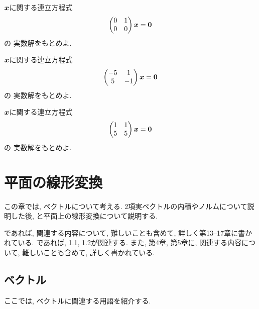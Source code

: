 \begin{quiz}
  \label{quiz:3:8}
  $\boldsymbol{x}$に関する連立方程式
  \begin{align*}
    \begin{pmatrix}0&1\\0&0\end{pmatrix}
      \boldsymbol{x}
      =\boldsymbol{0}
  \end{align*}
  の
  実数解をもとめよ.
\end{quiz}

\begin{quiz}
  \label{quiz:3:9}
  $\boldsymbol{x}$に関する連立方程式
  \begin{align*}
    \begin{pmatrix}-5&1\\5&-1\end{pmatrix}
      \boldsymbol{x}
      =\boldsymbol{0}
  \end{align*}
  の
  実数解をもとめよ.
\end{quiz}

\begin{quiz}
  \label{quiz:3:10}
  $\boldsymbol{x}$に関する連立方程式
  \begin{align*}
    \begin{pmatrix}1&1\\5&5\end{pmatrix}
      \boldsymbol{x}
      =\boldsymbol{0}
  \end{align*}
  の
  実数解をもとめよ.
\end{quiz}



  
\chapter{平面の線形変換}
\label{chap:lintrans}
この章では,
ベクトルについて考える.
2項実ベクトルの内積やノルムについて説明した後,
と平面上の線形変換について説明する.

\cite{978-4-7806-0772-7}であれば,
関連する内容について,
難しいことも含めて, 詳しく第13--17章に書かれている.
\cite{978-4-7806-0164-0}であれば,
1.1, 1.2が関連する.
また, 第4章, 第5章に, 
 関連する内容について, 難しいことも含めて, 詳しく書かれている.

\section{ベクトル}
\label{sec:vect}
ここでは, ベクトルに関連する用語を紹介する.

